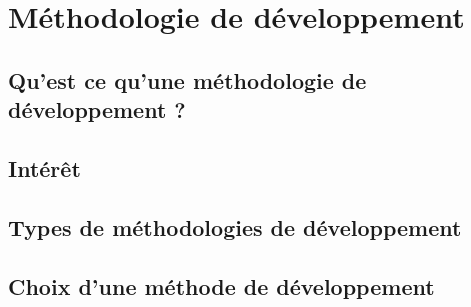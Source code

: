 \chapter{Méthodologie de développement}

\section{Qu'est ce qu'une méthodologie de développement ?}

\section{Intérêt}

\section{Types de méthodologies de développement}

\section{Choix d'une méthode de développement}

\clearpage 